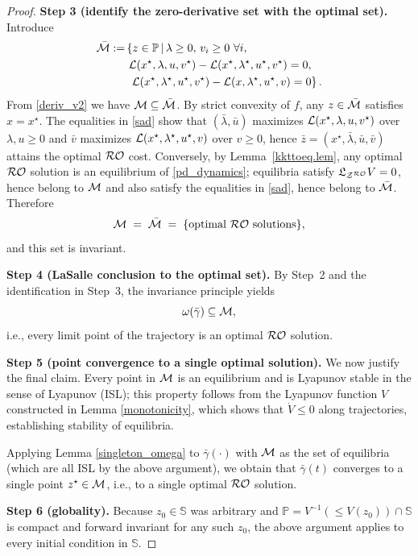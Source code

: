 \documentclass[journal,twoside,web]{ieeecolor}
\newcommand{\rev}[1]{\textcolor{revisionblue}{#1}}
\begin{document}
\begin{proof}
\medskip
\rev{\textbf{Step 3 (identify the zero-derivative set with the optimal set).}
Introduce
\begin{align}
\bar{\cal M}:=& \left\{z \in \mathbb P\,\middle|\,\lambda\geq 0,\, v_i\geq 0\ \forall i,\right.\nonumber\\
&\ {\cal L}(x^\star,\lambda,u,v^\star)-{\cal L}(x^\star,\lambda^\star,u^\star,v^\star)=0,\nonumber\\
&\left.\ {\cal L}(x^\star,\lambda^\star,u^\star,v^\star)-{\cal L}(x,\lambda^\star,u^\star,v)=0 \right\}.
\label{sad}
\end{align}
From \eqref{deriv_v2} we have ${\cal M}\subseteq \bar{\cal M}$.
By strict convexity of $f$, any $z\in\bar{\cal M}$ satisfies $x=x^\star$. The equalities in \eqref{sad} show that $(\bar\lambda,\bar u)$ maximizes ${\cal L}(x^\star,\lambda,u,v^\star)$ over $\lambda,u\ge 0$ and $\bar v$ maximizes ${\cal L}(x^\star,\lambda^\star,u^\star,v)$ over $v\ge 0$, hence $\bar z=(x^\star,\bar\lambda,\bar u,\bar v)$ attains the optimal ${\cal RO}$ cost.
Conversely, by Lemma~\ref{kkttoeq.lem}, any optimal ${\cal RO}$ solution is an equilibrium of \eqref{pd_dynamics}; equilibria satisfy $\mathfrak{L}_{{\cal Z}^{\cal RO}}V=0$, hence belong to ${\cal M}$ and also satisfy the equalities in \eqref{sad}, hence belong to $\bar{\cal M}$. Therefore
\[
{\cal M}\;=\;\bar{\cal M}\;=\;\{\text{optimal ${\cal RO}$ solutions}\},
\]
and this set is invariant.}

\medskip
\rev{\textbf{Step 4 (LaSalle conclusion to the optimal set).}
By Step~2 and the identification in Step~3, the invariance principle yields
\[
\omega(\bar\gamma)\subseteq {\cal M},
\]
i.e., every limit point of the trajectory is an optimal ${\cal RO}$ solution.}

\medskip
\rev{\textbf{Step 5 (point convergence to a single optimal solution).}
We now justify the final claim. Every point in ${\cal M}$ is an equilibrium and is Lyapunov stable in the sense of Lyapunov (ISL); this property follows from the Lyapunov function $V$ constructed in Lemma \ref{monotonicity}, which shows that $\dot{V} \leq 0$ along trajectories, establishing stability of equilibria.

Applying Lemma \ref{singleton_omega} to $\bar\gamma(\cdot)$ with ${\cal M}$ as the set of equilibria (which are all ISL by the above argument), we obtain that $\bar\gamma(t)$ converges to a single point $z^\star\in{\cal M}$, i.e., to a single optimal ${\cal RO}$ solution.}

\medskip
\rev{\textbf{Step 6 (globality).}
Because $z_0\in\mathbb S$ was arbitrary and $\mathbb P=V^{-1}(\le V(z_0))\cap\mathbb S$ is compact and forward invariant for any such $z_0$, the above argument applies to every initial condition in $\mathbb S$.}
\end{proof}
\end{document}
